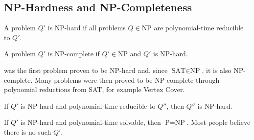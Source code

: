 
\subsection{NP-Hardness and NP-Completeness}
\begin{definition}[NP-Hard]
A problem $Q'$ is NP-hard if all problems $Q \in \text{NP}$ are polynomial-time reducible to $Q'$.
\end{definition}

\begin{definition}[NP-Complete]
A problem $Q'$ is NP-complete if $Q' \in \text{NP}$ and $Q'$ is NP-hard.
\end{definition}
\begin{example}
was the first problem proven to be NP-hard and, since $\text{SAT} \in \text{NP}$, it is also NP-complete.
Many problems were then proved to be NP-complete through polynomial reductions from SAT, for example Vertex Cover.
\end{example}

\begin{theorem}
If $Q'$ is NP-hard and polynomial-time reducible to $Q''$, then $Q''$ is NP-hard.
\end{theorem}
\begin{theorem}
If $Q'$ is NP-hard and polynomial-time solvable, then $\text{P}=\text{NP}$.
Most people believe there is no such $Q'$.
\end{theorem}







